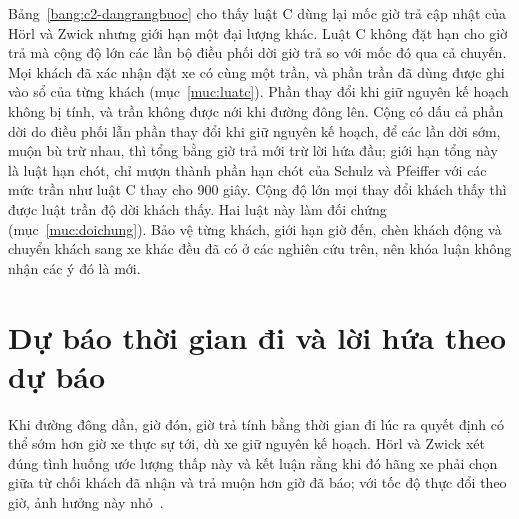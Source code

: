 Bảng~\ref{bang:c2-dangrangbuoc} cho thấy luật C dùng lại mốc giờ trả cập nhật của Hörl và Zwick nhưng giới hạn một
đại lượng khác. Luật C không đặt hạn cho giờ trả mà cộng độ lớn các lần bộ điều phối dời giờ trả so với mốc đó qua cả
chuyến. Mọi khách đã xác nhận đặt xe có cùng một trần, và phần trần đã dùng được ghi vào sổ của từng khách
(mục~\ref{muc:luatc}). Phần thay đổi khi giữ nguyên kế hoạch không bị tính, và trần không được nới khi đường đông lên.
Cộng có dấu cả phần dời do điều phối lẫn phần thay đổi khi giữ nguyên kế hoạch, để các lần dời sớm, muộn bù trừ nhau,
thì tổng bằng giờ trả mới trừ lời hứa đầu; giới hạn tổng này là luật hạn chót, chỉ mượn thành phần hạn chót của
Schulz và Pfeiffer với các mức trần như luật C thay cho 900 giây. Cộng độ lớn mọi thay đổi khách thấy thì được luật
trần độ dời khách thấy. Hai luật này làm đối chứng (mục~\ref{muc:doichung}). Bảo vệ từng khách, giới hạn giờ đến, chèn khách động và chuyển khách sang xe khác đều đã có
ở các nghiên cứu trên, nên khóa luận không nhận các ý đó là mới.

\section{Dự báo thời gian đi và lời hứa theo dự báo}
\label{muc:c2-dubao}

Khi đường đông dần, giờ đón, giờ trả tính bằng thời gian đi lúc ra quyết định có thể sớm hơn giờ xe thực sự tới, dù
xe giữ nguyên kế hoạch. Hörl và Zwick xét đúng tình huống ước lượng thấp này và kết luận rằng khi đó hãng xe phải chọn
giữa từ chối khách đã nhận và trả muộn hơn giờ đã báo; với tốc độ thực đổi theo giờ, ảnh hưởng này nhỏ~\cite{horl2022}.


